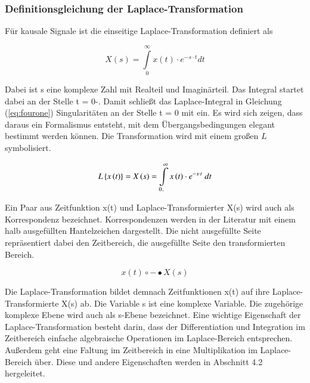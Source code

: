 \subsubsection{Definitionsgleichung der Laplace-Transformation}\label{threeoneone}

\noindent Für kausale Signale ist die einseitige Laplace-Transformation definiert als

\begin{equation}\label{eq:fourone}
X(s) = \int\limits _{0}^{\infty} x(t) \cdot e^{-s\cdot t} dt
\end{equation}

\noindent Dabei ist s eine komplexe Zahl mit Realteil und Imaginärteil. Das Integral startet dabei an der Stelle t = 0-. Damit schließt das Laplace-Integral in Gleichung (\ref{eq:fourone}) Singularitäten an der Stelle t = 0 mit ein.
Es wird sich zeigen, dass daraus ein Formalismus entsteht, mit dem Übergangsbedingungen elegant bestimmt werden können. Die Transformation wird mit einem großen $L$ symbolisiert.

\begin{equation}\label{eq:fourtwo}
L\left\{x\left(t\right)\right\}=X\left(s\right)=\int\limits _{0_{-} }^{\infty }x\left(t\right)\cdot e^{-s\cdot t} {\rm \; } dt
\end{equation}

\noindent Ein Paar aus Zeitfunktion x(t) und Laplace-Transformierter X(s) wird auch als Korrespondenz bezeichnet. Korrespondenzen werden in der Literatur mit einem halb ausgef\"{u}llten Hantelzeichen dargestellt. Die nicht ausgef\"{u}llte Seite repr\"{a}sentiert dabei den Zeitbereich, die ausgef\"{u}llte Seite den transformierten Bereich.

\begin{equation}\label{eq:fourthree}
x\left(t\right)\circ -\bullet X\left(s\right)
\end{equation}


\noindent Die Laplace-Transformation bildet demnach Zeitfunktionen x(t) auf ihre Laplace-Transformierte X(s) ab. Die Variable s ist eine komplexe Variable. Die zugehörige komplexe Ebene wird auch als s-Ebene bezeichnet. Eine wichtige Eigenschaft der Laplace-Transformation besteht darin, dass der Differentiation und Integration im Zeitbereich einfache algebraische Operationen im Laplace-Bereich entsprechen. Au{\ss}erdem geht eine Faltung im Zeitbereich in eine Multiplikation im Laplace-Bereich \"{u}ber. Diese und andere Eigenschaften werden in Abschnitt 4.2 hergeleitet.

